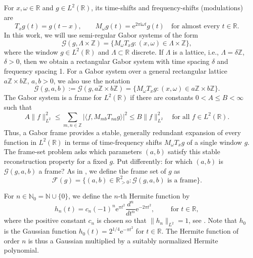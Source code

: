 \documentclass[11pt]{amsart}
\numberwithin{equation}{section}
\theoremstyle{definition}
\theoremstyle{remark}
\newcommand{\R}{\mathbb R}
\newcommand{\Z}{\mathbb Z}
\newcommand{\N}{\mathbb N}
\newcommand{\ii}{\mathrm i}
\newcommand{\e}{\mathrm e}
\newcommand{\cG}{\mathcal G}
\newcommand{\cF}{\mathcal F}
\begin{document}
For $x,\omega\in\R$ and $g\in L^2(\R)$, its time-shifts and frequency-shifts (modulations) are
\begin{equation}
    T_x g(t) = g(t-x),
    \qquad
    M_\omega g(t) = \e^{2\pi\ii\omega t} g(t)
    \quad\text{for almost every }t\in\R.
\end{equation}
In this work, we will use semi-regular Gabor systems of the form
\begin{equation}
    \cG(g,\Lambda \times \Z) = \{ M_\omega T_x g : (x,\omega) \in \Lambda \times \Z\},
\end{equation}
where the window $g \in L^2(\R)$ and $\Lambda \subset \R$ discrete. If $\Lambda$ is a lattice, i.e., $\Lambda = \delta \Z$, $\delta > 0$, then we obtain a rectangular Gabor system with time spacing $\delta$ and frequency spacing 1. For a Gabor system over a general rectangular lattice $a \Z \times b \Z$, $a,b>0$, we also use the notation
\begin{equation}
  \cG(g,a,b) := \cG(g,a\Z \times b\Z) = \{M_\omega T_x g : (x,\omega) \in a \Z \times b \Z \}.
\end{equation}
The Gabor system is a frame for $L^2(\R)$ if there are constants $0<A\leq B<\infty$ such that
\begin{equation}
  A\|f\|_{L^2}^2
  \leq
  \sum_{m,n\in\Z}|\langle f,M_{mb}T_{na}g\rangle|^2
  \leq
  B\|f\|_{L^2}^2
  \quad\text{for all }f\in L^2(\R).
\end{equation}
Thus, a Gabor frame provides a stable, generally redundant expansion of every function in $L^2(\mathbb{R})$ in terms of time-frequency shifts $M_\omega T_x g$ of a single window $g$. The frame-set problem asks which parameters $(a,b)$ satisfy this stable reconstruction property for a fixed $g$. Put differently: for which $(a,b)$ is $\cG(g,a,b)$ a frame? As in \cite{Gro14}, we define the frame set of $g$ as
\begin{equation}
  \cF (g) = \{(a,b) \in \R_{>0}^2 : \cG(g,a,b) \text{ is a frame}\}.
\end{equation}

For $n \in \N_0 = \N \cup \{0\}$, we define the $n$-th Hermite function by
\begin{equation}\label{eq:hn}
    h_n(t)
    =
    c_n(-1)^n \e^{\pi t^2}
    \frac{d^n}{dt^n} \e^{-2\pi t^2},    
    \qquad  \text{ for } t\in\R,
\end{equation}
where the positive constant $c_n$ is chosen so that $\|h_n\|_{L^2}=1$, see \cite{FollandPhase}. Note that $h_0$ is the Gaussian function $h_0(t) = 2^{1/4} \e^{-\pi t^2}$ for $t\in\R$. The Hermite function of order $n$ is thus a Gaussian multiplied by a suitably normalized Hermite polynomial.
\end{document}
